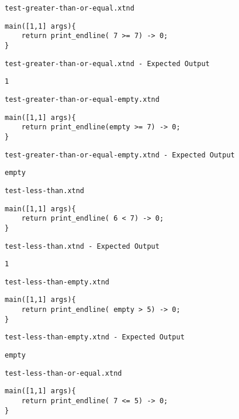 \medskip \noindent \texttt{test-greater-than-or-equal.xtnd}


\begin{lstlisting}
main([1,1] args){
	return print_endline( 7 >= 7) -> 0;
}
\end{lstlisting}


\medskip \noindent \texttt{test-greater-than-or-equal.xtnd - Expected Output}


\begin{lstlisting}
1
\end{lstlisting}


\medskip \noindent \texttt{test-greater-than-or-equal-empty.xtnd}


\begin{lstlisting}
main([1,1] args){
	return print_endline(empty >= 7) -> 0;
}
\end{lstlisting}


\medskip \noindent \texttt{test-greater-than-or-equal-empty.xtnd - Expected Output}


\begin{lstlisting}
empty
\end{lstlisting}


\medskip \noindent \texttt{test-less-than.xtnd}


\begin{lstlisting}
main([1,1] args){
	return print_endline( 6 < 7) -> 0;
}
\end{lstlisting}


\medskip \noindent \texttt{test-less-than.xtnd - Expected Output}


\begin{lstlisting}
1
\end{lstlisting}


\medskip \noindent \texttt{test-less-than-empty.xtnd}


\begin{lstlisting}
main([1,1] args){
	return print_endline( empty > 5) -> 0;
}
\end{lstlisting}


\medskip \noindent \texttt{test-less-than-empty.xtnd - Expected Output}


\begin{lstlisting}
empty
\end{lstlisting}


\medskip \noindent \texttt{test-less-than-or-equal.xtnd}


\begin{lstlisting}
main([1,1] args){
	return print_endline( 7 <= 5) -> 0;
}
\end{lstlisting}


